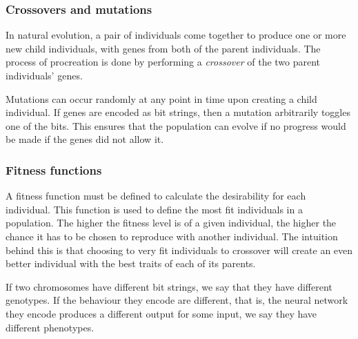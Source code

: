 
\subsubsection{Crossovers and mutations}
In natural evolution, a pair of individuals come together to produce one or more new child individuals, with genes from both of the parent individuals. The process of procreation is done by performing a \emph{crossover} of the two parent individuals' genes.



Mutations can occur randomly at any point in time upon creating a child individual. If genes are encoded as bit strings, then a mutation arbitrarily toggles one of the bits. This ensures that the population can evolve if no progress would be made if the genes did not allow it.

\subsubsection{Fitness functions}
A fitness function must be defined to calculate the desirability for each individual. This function is used to define the most fit individuals in a population. The higher the fitness level is of a given individual, the higher the chance it has to be chosen to reproduce with another individual. The intuition behind this is that choosing to very fit individuals to crossover will create an even better individual with the best traits of each of its parents.



If two chromosomes have different bit strings, we say that they have different genotypes.
If the behaviour they encode are different, that is, the neural network they encode produces a different output for some input,  we say they have different phenotypes.

